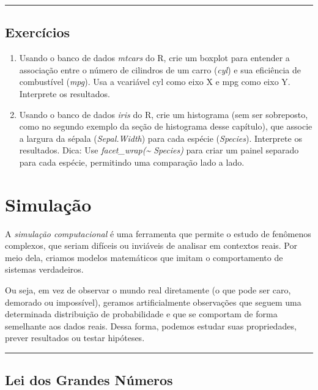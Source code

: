 \documentclass[
]{book}
\begin{document}
\begin{center}\rule{0.5\linewidth}{0.5pt}\end{center}

\section{Exercícios}\label{exercuxedcios-5}

\begin{enumerate}
\def\labelenumi{\arabic{enumi}.}
\item
  Usando o banco de dados \emph{mtcars} do R, crie um boxplot para entender a associação entre o número de cilindros de um carro (\emph{cyl}) e sua eficiência de combustível (\emph{mpg}). Usa a vcariável cyl como eixo X e mpg como eixo Y. Interprete os resultados.
\item
  Usando o banco de dados \emph{iris} do R, crie um histograma (sem ser sobreposto, como no segundo exemplo da seção de histograma desse capítulo), que associe a largura da sépala (\emph{Sepal.Width}) para cada espécie (\emph{Species}). Interprete os resultados.
  Dica: Use \emph{facet\_wrap(\textasciitilde{} Species)} para criar um painel separado para cada espécie, permitindo uma comparação lado a lado.
\end{enumerate}

\chapter{Simulação}\label{simulauxe7uxe3o}

A \emph{simulação computacional} é uma ferramenta que permite o estudo de fenômenos complexos, que seriam difíceis ou inviáveis de analisar em contextos reais. Por meio dela, criamos modelos matemáticos que imitam o comportamento de sistemas verdadeiros.

Ou seja, em vez de observar o mundo real diretamente (o que pode ser caro, demorado ou impossível), geramos artificialmente observações que seguem uma determinada distribuição de probabilidade e que se comportam de forma semelhante aos dados reais. Dessa forma, podemos estudar suas propriedades, prever resultados ou testar hipóteses.

\begin{center}\rule{0.5\linewidth}{0.5pt}\end{center}

\section{Lei dos Grandes Números}\label{lei-dos-grandes-nuxfameros}
\end{document}
